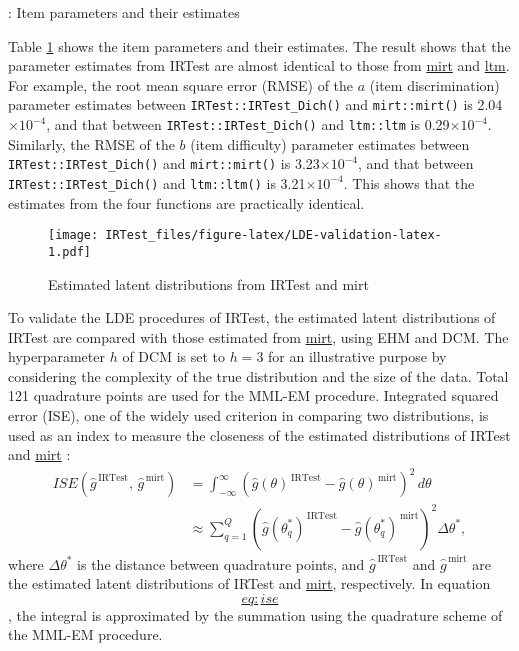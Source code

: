 : Item parameters and their estimates

Table \protect\hyperlink{tab:parameter-static}{1} shows the item parameters and their
estimates. The result shows that the parameter estimates from IRTest are
almost identical to those from
\href{https://CRAN.R-project.org/package=mirt}{mirt} and
\href{https://CRAN.R-project.org/package=ltm}{ltm}. For example, the root
mean square error (RMSE) of the \(a\) (item discrimination) parameter
estimates between \texttt{IRTest::IRTest\_Dich()} and \texttt{mirt::mirt()} is
2.04\(\times 10^{-4}\), and that between \texttt{IRTest::IRTest\_Dich()} and
\texttt{ltm::ltm} is 0.29\(\times 10^{-4}\). Similarly, the RMSE of the \(b\) (item
difficulty) parameter estimates between \texttt{IRTest::IRTest\_Dich()} and
\texttt{mirt::mirt()} is 3.23\(\times 10^{-4}\), and that between
\texttt{IRTest::IRTest\_Dich()} and \texttt{ltm::ltm()} is 3.21\(\times 10^{-4}\). This
shows that the estimates from the four functions are practically
identical.

\begin{figure}
\hypertarget{fig:LDE-validation-latex}{%
\centering
\texttt{[image: IRTest\_files/figure-latex/LDE-validation-latex-1.pdf]}
\caption{Estimated latent distributions from IRTest and
mirt}\label{fig:LDE-validation-latex}
}
\end{figure}

To validate the LDE procedures of IRTest, the estimated latent
distributions of IRTest are compared with those estimated from
\href{https://CRAN.R-project.org/package=mirt}{mirt}, using EHM and DCM. The
hyperparameter \(h\) of DCM is set to \(h=3\) for an illustrative purpose by
considering the complexity of the true distribution and the size of the
data. Total 121 quadrature points are used for the MML-EM procedure.
Integrated squared error (ISE), one of the widely used criterion in
comparing two distributions, is used as an index to measure the
closeness of the estimated distributions of IRTest and
\href{https://CRAN.R-project.org/package=mirt}{mirt} \citep[for the usages of ISE,
see][]{Jones:1991}: \[\begin{split}
ISE{\left( \hat{g}^{\,\text{IRTest}}, \, \hat{g}^{\,\text{mirt}} \right)} &=
\int_{-\infty}^{\infty}{\left(
{\hat{g}(\theta)}^{\,\text{IRTest}} - {\hat{g}(\theta)}^{\,\text{mirt}}
\right)^2\, d\theta} \\
&\approx \sum_{q=1}^{Q}{\left(
{\hat{g}\left(\theta_{q}^{*}\right)}^{\,\text{IRTest}} - 
{\hat{g}\left(\theta_{q}^{*}\right)}^{\,\text{mirt}}
\right)^2 \Delta\theta^{*}},
\end{split}
\label{eq:ise}\] where \(\Delta\theta^{*}\) is the distance between
quadrature points, and \(\hat{g}^{\,\text{IRTest}}\) and
\(\hat{g}^{\,\text{mirt}}\) are the estimated latent distributions of
IRTest and \href{https://CRAN.R-project.org/package=mirt}{mirt},
respectively. In equation \protect\hyperlink{eq:ise}{\[eq:ise\]}, the integral is approximated by the summation using
the quadrature scheme of the MML-EM procedure.

